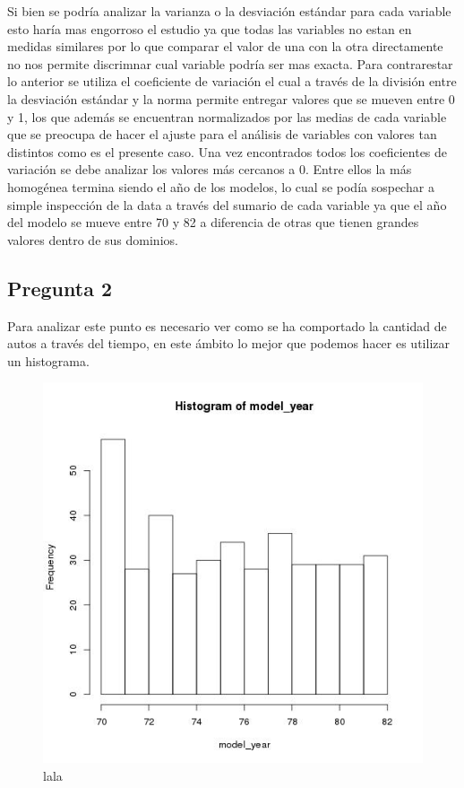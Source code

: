 \documentclass[letter,10pt]{article}
\begin{document}
Si bien se podría analizar la varianza o la desviación estándar para cada variable esto haría mas engorroso el estudio ya que
todas las variables no estan en medidas similares por lo que comparar el valor de una con la otra directamente no nos permite discrimnar
cual variable podría ser mas exacta. Para contrarestar lo anterior se utiliza el coeficiente de variación el cual a través de la división
entre la desviación estándar y la norma permite entregar valores que se mueven entre 0 y 1, los que además se encuentran normalizados
por las medias de cada variable que se preocupa de hacer el ajuste para el análisis de variables con valores tan distintos como es el presente caso.
Una vez encontrados todos los coeficientes de variación se debe analizar los valores más cercanos a 0. Entre ellos la más homogénea
termina siendo el año de los modelos, lo cual se podía sospechar a simple inspección de la data a través del sumario de cada variable
ya que el año del modelo se mueve entre 70 y 82 a diferencia de otras que tienen grandes valores dentro de sus dominios.


\subsection{Pregunta 2}

Para analizar este punto es necesario ver como se ha comportado la cantidad de autos a través del tiempo,
en este ámbito lo mejor que podemos hacer es utilizar un histograma.

\begin{figure}[h!]
    \centering
    \includegraphics[scale=0.4]{model_year_histogram.jpg}
    \caption{lala}
    \label{fig:lala}
\end{figure}
\end{document}
